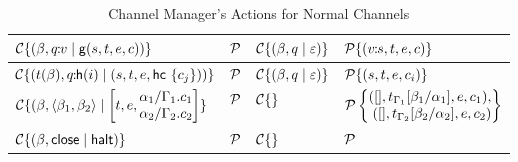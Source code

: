 \documentclass[11pt]{article}
\newcommand{\<}{\langle}
\renewcommand{\>}{\rangle}
\begin{document}
\begin{table}[!h]
\begin{center}
\begin{tabular}{|l|l||l|l|} \hline
${\cal C}\{ (\beta , q\!\!:\!\!v \mid {\sf g}(s,t,e,c)) \}$ & ${\cal P}$ & ${\cal C}\{ (\beta,q \mid \varepsilon) \}$ & ${\cal P}\{(v\!\!:\!\! s,t,e,c)\}$ \\ \hline
${\cal C}\{ (t(\beta) , q\!\!:\!\!{\sf h}(i)  \mid (s,t,e,{\sf hc} ~\{ c_j \})) \}$ & ${\cal P}$ & ${\cal C}\{ (\beta,q \mid \varepsilon) \}$ & ${\cal P}\{(s,t,e,c_i)\}$ \\ \hline
${\cal C}\{ (\beta, \<\beta_1,\beta_2\> \mid \left[t,e,\!\!\!\begin{array}[c]{l} \alpha_1/\Gamma_1. c_1 \\ \alpha_2/\Gamma_2. c_2 \end{array} \!\!\!\right] \} $ & ${\cal P}$ 
                     & ${\cal C}\{ \}$ & ${\cal P}\left\{ \!\!\!\begin{array}{r} ([],t_{\Gamma_1}[\beta_1/\alpha_1],e,c_1), \\
                                              ([],t_{\Gamma_2}[\beta_2/\alpha_2],e,c_2) \end{array} \!\!\!\right\}$ \\ \hline
${\cal C}\{ (\beta,{\sf close}\mid {\sf halt} ) \}$ & ${\cal P}$ & ${\cal C}\{ \}$ & ${\cal P}$ \\ \hline
\end{tabular}
\caption{Channel Manager's Actions for Normal Channels}
\label{channel-actions}
\end{center}
\end{table}

\end{document}
